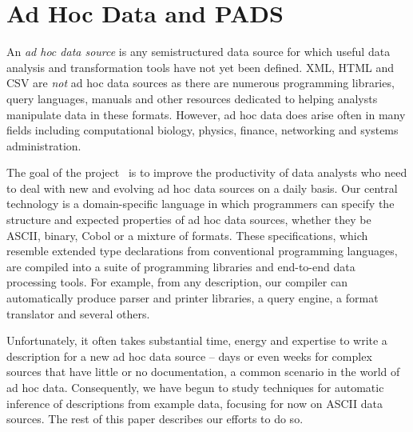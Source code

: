 \documentclass{article}
\begin{document}
\section*{Ad Hoc Data and PADS}
\label{intro}

An {\em ad hoc data source} is any semistructured data source
for which useful data analysis and transformation tools
have not yet been defined. XML, HTML and CSV are {\em not} 
ad hoc data sources as there are numerous programming libraries,
query languages, manuals and other resources dedicated to
helping analysts manipulate data in these formats.
However, ad hoc data does arise often in many fields including
computational biology, physics, finance, networking and 
systems administration.

The goal of the \pads{} project~\cite{padsweb} is to improve the
productivity of data analysts who need to deal with new and evolving
ad hoc data sources on a daily basis.  Our central technology is a
domain-specific language in which programmers can specify the
structure and expected properties of ad hoc data sources, whether they
be ASCII, binary, Cobol or a mixture of formats.  These
specifications, which resemble extended type declarations from
conventional programming languages, are compiled into a suite of
programming libraries and end-to-end data processing tools.  For
example, from any \pads{} description, our compiler can automatically
produce parser and printer libraries, a query engine, a format translator
and several others.

Unfortunately, it often takes substantial time, energy and expertise
to write a \pads{} description for a new ad hoc data source
-- days or even weeks for complex sources that have little or
no documentation, a common scenario in the world of ad hoc data.
Consequently, we have begun to study techniques for automatic
inference of \pads{} descriptions from example data, focusing for now
on ASCII data sources.   The rest of this 
paper describes our efforts to do so.


\end{document}
